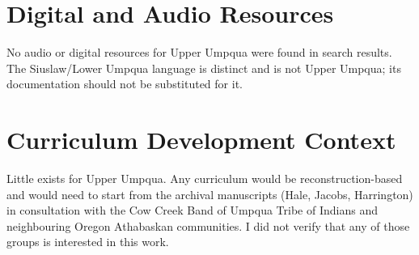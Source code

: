 \documentclass[12pt]{article}
\begin{document}
\section{Digital and Audio Resources}
No audio or digital resources for Upper Umpqua were found in search results. The Siuslaw/Lower Umpqua language is distinct and is not Upper Umpqua; its documentation should not be substituted for it.

\section{Curriculum Development Context}
Little exists for Upper Umpqua. Any curriculum would be reconstruction-based and would need to start from the archival manuscripts (Hale, Jacobs, Harrington) in consultation with the Cow Creek Band of Umpqua Tribe of Indians and neighbouring Oregon Athabaskan communities. I did not verify that any of those groups is interested in this work.
\end{document}
